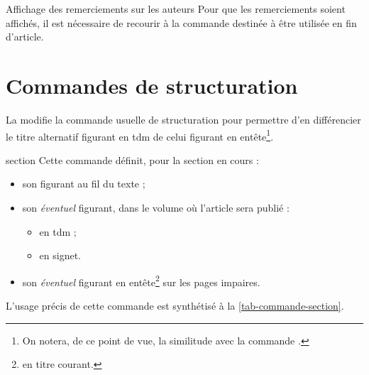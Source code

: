 \documentclass[english,nolocaltoc]{nwejmart}
\newtheorem[style=definition]{fait}
\newtheorem[title=expérience]{experience}
\newtheorem[title-plural=anneaux]{anneau}
\newtheorem[title=idéal,title-plural=idéaux]{ideal}
\begin{document}
\begin{bodycode}[listing options={deletekeywords={[2]first}}]
\end{bodycode}

\begin{dbremark}{Affichage des remerciements sur les auteurs}{}
  Pour que les remerciements soient affichés, il est nécessaire de recourir à la
  commande  destinée à être utilisée en fin d'article.
\end{dbremark}

\section{Commandes de structuration}

La \nwejmauthorcl{} modifie la commande usuelle de structuration
 pour permettre d'en différencier le titre alternatif
figurant en \gls{tdm} de celui figurant en entête\footnote{On notera, de ce
  point de vue, la similitude avec la commande \protect{}.}.

\begin{docCommand}[doc new=2017-10-23]{section}{}
  Cette commande définit, pour la section en cours :
  \begin{itemize}
  \item son  figurant au fil du texte ;
  \item son \emph{éventuel}  figurant, dans le volume où
    l'article sera publié :
    \begin{itemize}
    \item en \gls{tdm} ;
    \item en signet.
    \end{itemize}
  \item son \emph{éventuel}  figurant en
    entête\footnote{\Ie{} en titre courant.} sur les pages impaires.
  \end{itemize}
  L'usage précis de cette commande est synthétisé à la
  \vref{tab-commande-section}.
\end{docCommand}
\end{document}
